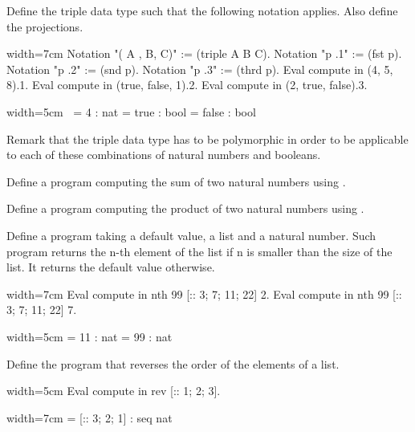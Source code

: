 \begin{Exercise}[label=ex:triple,difficulty=0,title={The triple data type}]
Define the triple data type such that the following notation
applies.  Also define the projections.

\begin{coq}{}{width=7cm}
Notation "( A , B, C)" := (triple A B C).
Notation "p .1" := (fst p).
Notation "p .2" := (snd p).
Notation "p .3" := (thrd p).
Eval compute in (4, 5, 8).1.
Eval compute in (true, false, 1).2.
Eval compute in (2, true, false).3.
\end{coq}
\begin{coqout}{}{width=5cm}
$~$
     = 4 : nat
     = true : bool
     = false : bool
\end{coqout}
Remark that the triple data type has to be polymorphic in order to
be applicable to each of these combinations of natural numbers and
booleans.
\end{Exercise}

\begin{Exercise}[label=ex:iteradd,difficulty=0,title={Addition with iteration}]
Define a program computing the sum of two natural numbers
using .
\end{Exercise}

\begin{Exercise}[label=ex:itermul,difficulty=0,title={Multiplication with iteration}]
Define a program computing the product of two natural numbers
using .
\end{Exercise}

\begin{Exercise}[label=ex:nth,difficulty=0,title={Find the n-th element}]
Define a program taking a default value, a list and  a natural number.  Such
program returns the n-th element of the list if n is smaller than the size of
the list.  It returns the default value otherwise.

\begin{coq}{}{width=7cm}
Eval compute in
  nth 99 [:: 3; 7; 11; 22] 2.
Eval compute in
  nth 99 [:: 3; 7; 11; 22] 7.
\end{coq}
\begin{coqout}{}{width=5cm}
     = 11
     : nat
     = 99
     : nat
\end{coqout}
\end{Exercise}

\begin{Exercise}[label=ex:rev,difficulty=0,title={List reversal}]
Define the program  that reverses the order of the elements
of a list.

\begin{coq}{}{width=5cm}
Eval compute in
  rev [:: 1; 2; 3].
\end{coq}
\begin{coqout}{}{width=7cm}
 = [:: 3; 2; 1]
 : seq nat
\end{coqout}
\end{Exercise}

